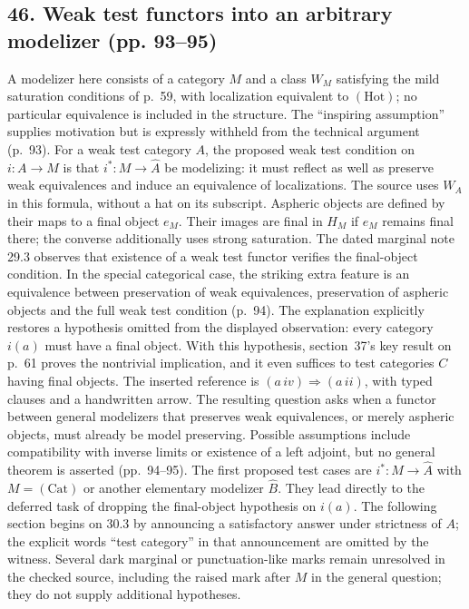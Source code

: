 \subsection*{46. Weak test functors into an arbitrary modelizer (pp. 93--95)}
A modelizer here consists of a category $M$ and a class $W_M$ satisfying the mild saturation conditions of p.~59, with localization equivalent to $(\mathrm{Hot})$; no particular equivalence is included in the structure. The ``inspiring assumption'' supplies motivation but is expressly withheld from the technical argument (p.~93). For a weak test category $A$, the proposed weak test condition on $i:A\to M$ is that $i^*:M\to\widehat A$ be modelizing: it must reflect as well as preserve weak equivalences and induce an equivalence of localizations. The source uses $W_A$ in this formula, without a hat on its subscript. Aspheric objects are defined by their maps to a final object $e_M$. Their images are final in $H_M$ if $e_M$ remains final there; the converse additionally uses strong saturation. The dated marginal note 29.3 observes that existence of a weak test functor verifies the final-object condition. In the special categorical case, the striking extra feature is an equivalence between preservation of weak equivalences, preservation of aspheric objects and the full weak test condition (p.~94). The explanation explicitly restores a hypothesis omitted from the displayed observation: every category $i(a)$ must have a final object. With this hypothesis, section~37's key result on p.~61 proves the nontrivial implication, and it even suffices to test categories $C$ having final objects. The inserted reference is $(a\,iv)\Rightarrow(a\,ii)$, with typed clauses and a handwritten arrow. The resulting question asks when a functor between general modelizers that preserves weak equivalences, or merely aspheric objects, must already be model preserving. Possible assumptions include compatibility with inverse limits or existence of a left adjoint, but no general theorem is asserted (pp.~94--95). The first proposed test cases are $i^*:M\to\widehat A$ with $M=(\mathrm{Cat})$ or another elementary modelizer $\widehat B$. They lead directly to the deferred task of dropping the final-object hypothesis on $i(a)$. The following section begins on 30.3 by announcing a satisfactory answer under strictness of $A$; the explicit words ``test category'' in that announcement are omitted by the witness. Several dark marginal or punctuation-like marks remain unresolved in the checked source, including the raised mark after $M$ in the general question; they do not supply additional hypotheses.

